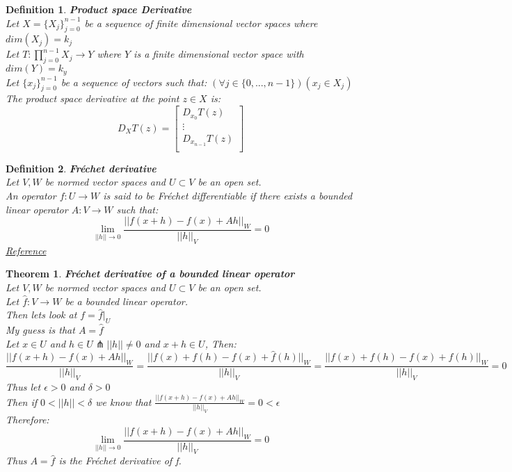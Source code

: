 \documentclass[12pt]{extarticle}
\theoremstyle{plain}
\newtheorem{thm}{Theorem}[section]
\theoremstyle{Definition}
\newtheorem{def.}{Definition}[section]
\theoremstyle{Definition}
\theoremstyle{plain}
\begin{document}
\newpage
\begin{def.} \textbf{Product space Derivative} \\ 
		Let $X = \{X_j\}_{j=0}^{n-1}$ be a sequence of finite dimensional vector spaces where $dim(X_j) = k_j$ \\ 
		Let $T : \prod_{j=0}^{n-1} X_j \to Y$ where $Y$ is a finite dimensional vector space with $dim(Y) = k_y$ \\
		Let $\{x_j\}_{j=0}^{n-1}$ be a sequence of vectors such that: $(\forall j \in \{0,...,n-1\})(x_j \in X_j)$ \\ 
		The product space derivative at the point $z \in X$ is: \\ 
		\[
		D_{X} T(z) = 
		\begin{bmatrix}
		D_{x_0} T(z) \\ 
		\vdots \\ 
		D_{x_{n-1}} T(z) \\ 		
		\end{bmatrix}
		\]
\end{def.}


\newpage
\begin{def.} \textbf{Fréchet derivative} \\ 
		Let $V,W$ be normed vector spaces and $U \subset V$ be an open set. \\ 
		An operator $f : U \to W$ is said to be Fréchet differentiable if there exists a bounded linear operator $A : V \to W$ such that: \\ 
		$$\lim_{||h||\to0} \frac{||f(x+h) - f(x) + Ah||_W}{||h||_V} = 0$$
		\href{https://en.wikipedia.org/wiki/Fr%C3%A9chet_derivative}{Reference}
\end{def.} 
\begin{thm} \textbf{Fréchet derivative of a bounded linear operator} \\ 
	Let $V,W$ be normed vector spaces and $U \subset V$ be an open set. \\ 
	Let $\hat{f} : V \to W$ be a bounded linear operator. \\
	Then lets look at $f = \hat{f}|_{U}$ \\ 
	My guess is that $A = \hat{f}$ \\ 
	Let $x \in U$ and $h \in U \pitchfork ||h|| \not = 0$ and $x+h \in U$, Then: \\ 
	$$\frac{||f(x+h) - f(x) + Ah||_W}{||h||_V} = \frac{||f(x)+f(h) - f(x) + \hat{f}(h)||_W}{||h||_V} = \frac{||f(x)+f(h) - f(x) + f(h)||_W}{||h||_V}= 0$$
	Thus let $\epsilon > 0$ and $\delta > 0$ \\ 
	Then if $0 < ||h|| < \delta$ we know that  
	$\frac{||f(x+h) - f(x) + Ah||_W}{||h||_V} = 0 < \epsilon$ \\ 
	Therefore: 
	$$\lim_{||h||\to0} \frac{||f(x+h) - f(x) + Ah||_W}{||h||_V} = 0$$
	Thus $A = \hat{f}$ is the Fréchet derivative  of f. 
\end{thm}
\end{document}
